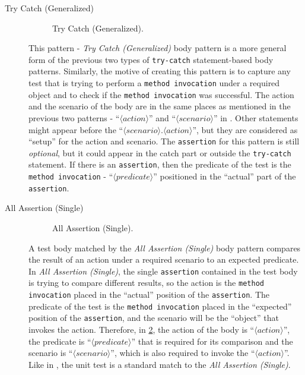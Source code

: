 \begin{description}
\item[Try Catch (Generalized)] 

\begin{figure}[htbp]
\centering
    \begin{subfigure}{0.65\textwidth}
    \end{subfigure}
\caption{Try Catch (Generalized).}
\label{tc_any}
\end{figure}

This pattern - \textit{Try Catch (Generalized)} body pattern is a more general form of the previous two types of \texttt{try-catch} statement-based body patterns.
%
Similarly, the motive of creating this pattern is to capture any test that is trying to perform a \texttt{method invocation} under a required object and to check if the \texttt{method invocation} was successful.
%
The action and the scenario of the body are in the same places as mentioned in the previous two patterns - \enquote{$\langle action \rangle$} and \enquote{$\langle scenario \rangle$} in .
%
Other statements might appear before the \enquote{$\langle scenario \rangle.\langle action \rangle$}, but they are considered as \enquote{setup} for the action and scenario.
%
The \texttt{assertion} for this pattern is still \emph{optional}, but it could appear in the catch part or outside the \texttt{try-catch} statement.
%
If there is an \texttt{assertion}, then the predicate of the test is the \texttt{method invocation} - \enquote{$\langle predicate \rangle$} positioned in the \enquote{actual} part of the \texttt{assertion}.


\item[All Assertion (Single)] 

\begin{figure}[htbp]
\centering
    \begin{subfigure}{0.7\textwidth}
    \end{subfigure}
\caption{All Assertion (Single).}
\label{AllA_single}
\end{figure}

A test body matched by the \textit{All Assertion (Single)} body pattern compares the result of an action under a required scenario to an expected predicate.
%
In \textit{All Assertion (Single)}, the single \texttt{assertion} contained in the test body is trying to compare different results, so the action is the \texttt{method invocation} placed in the \enquote{actual} position of the \texttt{assertion}.
%
The predicate of the test is the \texttt{method invocation} placed in the \enquote{expected} position of the \texttt{assertion}, and the scenario will be the \enquote{object} that invokes the action. 
%
Therefore, in \cref{AllA_single}, the action of the body is \enquote{$\langle action \rangle$}, the predicate is \enquote{$\langle predicate \rangle$} that is required for its comparison and the scenario is \enquote{$\langle scenario \rangle$}, which is also required to invoke the \enquote{$\langle action \rangle$}.
%
Like in , the unit test is a standard match to the \textit{All Assertion (Single)}.



\end{description}
